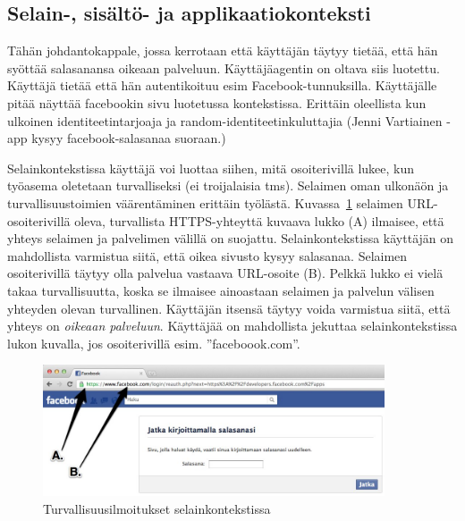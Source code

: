 \documentclass[finnish,gradu]{tktltiki}
\begin{document}
  \subsection{Selain-, sisältö- ja applikaatiokonteksti} %
  \label{sub:selainkonteksti_vs_applikaatiokonteksti}

  Tähän johdantokappale, jossa kerrotaan että käyttäjän täytyy tietää, että hän syöttää salasanansa oikeaan palveluun. Käyttäjäagentin on oltava siis luotettu. Käyttäjä tietää että hän autentikoituu esim Facebook-tunnuksilla. Käyttäjälle pitää näyttää facebookin sivu luotetussa kontekstissa. Erittäin oleellista kun ulkoinen identiteetintarjoaja ja random-identiteetinkuluttajia (Jenni Vartiainen -app kysyy facebook-salasanaa suoraan.)

  Selainkontekstissa käyttäjä voi luottaa siihen, mitä osoiterivillä lukee, kun työasema oletetaan turvalliseksi (ei troijalaisia tms). Selaimen oman ulkonäön ja turvallisuustoimien väärentäminen erittäin työlästä. Kuvassa~\ref{fig:facebook_reauth_ab} selaimen URL-osoiterivillä oleva, turvallista HTTPS-yhteyttä kuvaava lukko (A) ilmaisee, että yhteys selaimen ja palvelimen välillä on suojattu. Selainkontekstissa käyttäjän on mahdollista varmistua siitä, että oikea sivusto kysyy salasanaa. Selaimen osoiterivillä täytyy olla palvelua vastaava URL-osoite (B). Pelkkä lukko ei vielä takaa turvallisuutta, koska se ilmaisee ainoastaan selaimen ja palvelun välisen yhteyden olevan turvallinen. Käyttäjän itsensä täytyy voida varmistua siitä, että yhteys on \emph{oikeaan palveluun}. Käyttäjää on mahdollista jekuttaa selainkontekstissa lukon kuvalla, jos osoiterivillä esim. ''faceboook.com''.

  \begin{figure}
    \centering
    \includegraphics[width=0.9\textwidth]{images/Facebook_reauth_ab.jpg}
    \caption{Turvallisuusilmoitukset selainkontekstissa}
    \label{fig:facebook_reauth_ab}
  \end{figure}
\end{document}
